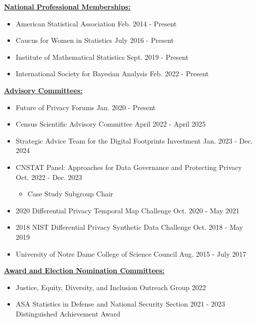
\underline{\textbf{\large National Professional Memberships:}}\normalsize
\begin{itemize}
    \item American Statistical Association \hfill Feb. 2014 - Present
    \item Caucus for Women in Statistics \hfill July 2016 - Present
    \item Institute of Mathematical Statistics \hfill Sept. 2019 - Present
    \item International Society for Bayesian Analysis \hfill Feb. 2022 - Present
\end{itemize}

\professionalspace
\underline{\textbf{\large Advisory Committees:}}\normalsize
\begin{itemize}
    \item Future of Privacy Forums \hfill Jan. 2020 - Present
    \item Census Scientific Advisory Committee \hfill April 2022 - April 2025
    \item Strategic Advice Team for the Digital Footprints Investment \hfill Jan. 2023 - Dec. 2024
    \item CNSTAT Panel: Approaches for Data Governance and Protecting Privacy \hfill Oct. 2022 - Dec. 2023
    \begin{itemize}
        \item Case Study Subgroup Chair
    \end{itemize}
    \item 2020 Differential Privacy Temporal Map Challenge \hfill Oct. 2020 - May 2021
    \item 2018 NIST Differential Privacy Synthetic Data Challenge \hfill Oct. 2018 - May 2019
    \item University of Notre Dame College of Science Council \hfill Aug. 2015 - July 2017
\end{itemize}

\professionalspace
\underline{\textbf{\large Award and Election Nomination Committees:}}\normalsize
\begin{itemize}
    \item Justice, Equity, Diversity, and Inclusion Outreach Group \hfill 2022
    \item ASA Statistics in Defense and National Security Section \hfill 2021 - 2023\\ Distinguished Achievement Award
\end{itemize}

